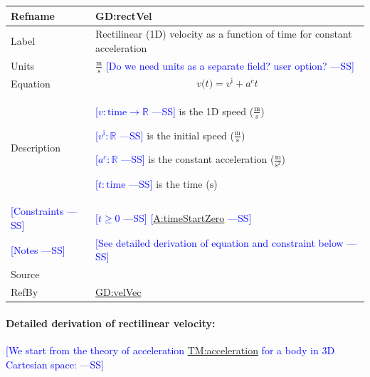 \documentclass[12pt]{article}
\newcommand{\authornote}[3]{\textcolor{#1}{[#3 ---#2]}}
\newcommand{\authornote}[3]{}
\newcommand{\wss}[1]{\authornote{blue}{SS}{#1}}
\begin{document}
\medskip
\noindent
\begin{minipage}{\textwidth}
\begin{tabular}{>{\raggedright}p{}>{\raggedright\arraybackslash}p{}}
\toprule \textbf{Refname} & \textbf{GD:rectVel}
\label{GD:rectVel}
\\ \midrule
Label & Rectilinear (1D) velocity as a function of time for constant acceleration
        
\\ \midrule
Units & $\frac{\text{m}}{\text{s}}$ \wss{Do we need units as a separate field? user option?}
\\ \midrule
Equation & \begin{displaymath}
           v\text{(}t\text{)}={v^{\text{i}}}+{a^{c}} t
           \end{displaymath}
\\ \midrule
Description & \begin{symbDescription}
              \item{\wss{$v: \text{time} \rightarrow \mathbb{R}$} is the 1D speed ($\frac{\text{m}}{\text{s}}$)}
              \item{\wss{${v^{\text{i}}: \mathbb{R}}$} is the initial speed ($\frac{\text{m}}{\text{s}}$)}
              \item{\wss{${a^{c}: \mathbb{R}}$} is the constant acceleration ($\frac{\text{m}}{\text{s}^{2}}$)}
              \item{\wss{$t: \text{time}$} is the time (${\text{s}}$)}
              \end{symbDescription}

\\ \midrule
\wss{Constraints} & \wss{$t \geq 0$}
\wss{\hyperref[timeStartZero]{A:timeStartZero}} 

\\ \midrule
\wss{Notes} & \wss{See detailed derivation of equation and constraint below}

\\ \midrule
Source & \cite[(pg. 8)]{hibbeler2004}
         
\\ \midrule
RefBy & \hyperref[GD:velVec]{GD:velVec}%
        
\\ \bottomrule
\end{tabular}
\end{minipage}

\paragraph{Detailed derivation of rectilinear velocity:}
\label{GD:rectVelDeriv}
\wss{We start from the theory of acceleration
\hyperref[TM:acceleration]{TM:acceleration} for a body in 3D Cartesian space:}
\end{document}
